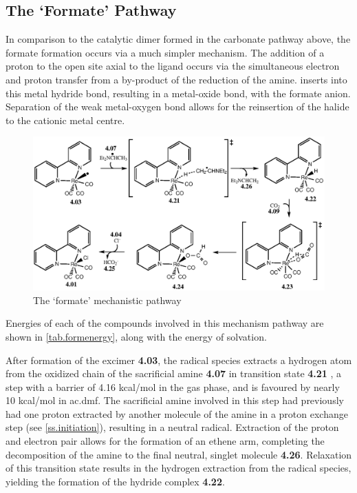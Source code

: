 \subsection{The `Formate' Pathway}\label{ss.formate}
In comparison to the catalytic dimer formed in the carbonate pathway above, the formate formation occurs via a much simpler mechanism. The addition of a proton to the open site axial to the ligand occurs via the simultaneous electron and proton transfer from a by-product of the reduction of the amine.  inserts into this metal hydride bond, resulting in a metal-oxide bond, with the formate anion. Separation of the weak metal-oxygen bond allows for the reinsertion of the halide to the cationic metal centre. 

\begin{figure}[!htb]
 \begin{center}
  \includegraphics[clip=true, width=\textwidth, keepaspectratio]{images/formate.eps}
 \end{center}
\caption{The `formate' mechanistic pathway}
\label{fig.formate}
\end{figure} 

Energies of each of the compounds involved in this mechanism pathway are shown in \autoref{tab.formenergy}, along with the energy of solvation.




After formation of the excimer \textbf{4.03}, the radical species extracts a hydrogen atom from the oxidized chain of the sacrificial amine \textbf{4.07} in transition state \textbf{4.21} , a step with a barrier of 4.16 kcal/mol in the gas phase, and is favoured by nearly 10 kcal/mol in \gls{ac.dmf}. The sacrificial amine involved in this step had previously had one proton extracted by another molecule of the amine in a proton exchange step (see \autoref{ss.initiation}), resulting in a neutral radical. Extraction of the proton and electron pair allows for the formation of an ethene arm, completing the decomposition of the amine to the final neutral, singlet molecule \textbf{4.26}. Relaxation of this transition state results in the hydrogen extraction from the radical species, yielding the formation of the hydride complex \textbf{4.22}.

